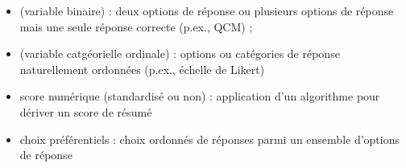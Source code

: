 




\begin{itemize}
\item {} (variable binaire) : deux options de réponse
  ou plusieurs options de réponse mais une seule réponse correcte (p.ex., QCM) ;
\item {} (variable catgéorielle ordinale) : options ou
  catégories de réponse naturellement ordonnées (p.ex., échelle de Likert)
\item score numérique (standardisé ou non) : application d'un algorithme pour
  dériver un score de résumé
\item choix préférentiels : choix ordonnés de réponses parmi un ensemble
  d'options de réponse
\end{itemize}


